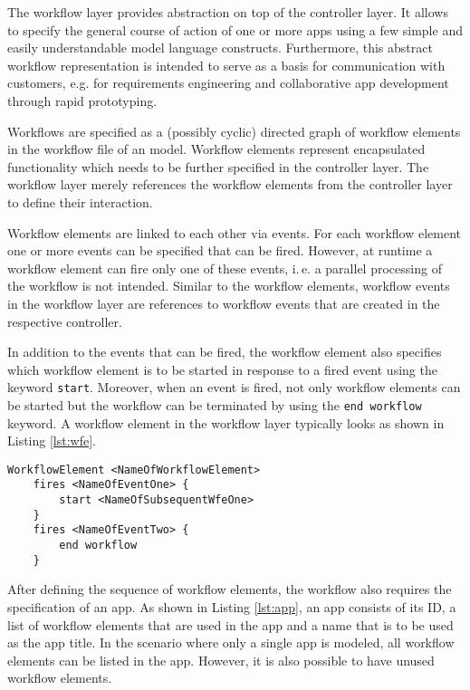 
The workflow layer provides abstraction on top of the controller layer. It allows to specify the general course of action of one or more apps using a few simple and easily understandable model language constructs. Furthermore, this abstract workflow representation is intended to serve as a basis for communication with customers, e.g. for requirements engineering and collaborative app development through rapid prototyping.

Workflows are specified as a (possibly cyclic) directed graph of workflow elements in the workflow file of an \MD model. Workflow elements represent encapsulated functionality which needs to be further specified in the controller layer. The workflow layer merely references the workflow elements from the controller layer to define their interaction.

Workflow elements are linked to each other via events. For each workflow element one or more events can be specified that can be fired. However, at runtime a workflow element can fire only one of these events, i.\,e. a parallel processing of the workflow is not intended. Similar to the workflow elements, workflow events in the workflow layer are references to workflow events that are created in the respective controller.

In addition to the events that can be fired, the workflow element also specifies which workflow element is to be started in response to a fired event using the keyword {\lstinline!start!}. Moreover, when an event is fired, not only workflow elements can be started but the workflow can be terminated by using the \lstinline!end workflow! keyword.
A workflow element in the workflow layer typically looks as shown in Listing \ref{lst:wfe}.

\begin{lstlisting}[language=MD2, label=lst:wfe, caption=Workflow Elements in the Workflow Layer]
 WorkflowElement <NameOfWorkflowElement>
 	fires <NameOfEventOne> {
		start <NameOfSubsequentWfeOne>
	}
	fires <NameOfEventTwo> {
		end workflow
	}
\end{lstlisting}

After defining the sequence of workflow elements, the workflow also requires the specification of an app. As shown in Listing \ref{lst:app}, an app consists of its ID, a list of workflow elements that are used in the app and a name that is to be used as the app title. In the scenario where only a single app is modeled, all workflow elements can be listed in the app. However, it is also possible to have unused workflow elements.


